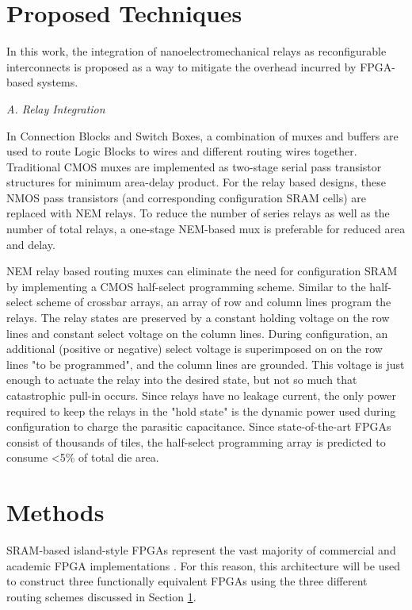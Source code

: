 \documentclass[twoside,twocolumn]{article}
\begin{document}

\section{Proposed Techniques}\label{sec:proposed}

In this work, the integration of nanoelectromechanical relays as reconfigurable interconnects is proposed as a way to mitigate the overhead incurred by FPGA-based systems. 

\textit{A. Relay Integration}

In Connection Blocks and Switch Boxes, a combination of muxes and buffers are used to route Logic Blocks to wires and different routing wires together. Traditional CMOS muxes are implemented as two-stage serial pass transistor structures for minimum area-delay product. For the relay based designs, these NMOS pass transistors (and corresponding configuration SRAM cells) are replaced with NEM relays. To reduce the number of series relays as well as the number of total relays, a one-stage NEM-based mux is preferable for reduced area and delay\cite{chen_efficient_2010}.

NEM relay based routing muxes can eliminate the need for configuration SRAM by implementing a CMOS half-select programming scheme\cite{chen_efficient_2010}. Similar to the half-select scheme of crossbar arrays, an array of row and column lines program the relays. The relay states are preserved by a constant holding voltage on the row lines and constant select voltage on the column lines. During configuration, an additional (positive or negative) select voltage is superimposed on on the row lines "to be programmed", and the column lines are grounded. This voltage is just enough to actuate the relay into the desired state, but not so much that catastrophic pull-in occurs. Since relays have no leakage current, the only power required to keep the relays in the "hold state" is the dynamic power used during configuration to charge the parasitic capacitance. Since state-of-the-art FPGAs consist of thousands of tiles, the half-select programming array is predicted to consume <5\% of total die area.


\section{Methods}\label{sec:methods}
SRAM-based island-style FPGAs represent the vast majority of commercial and academic
FPGA implementations \cite{farooq_fpga_2012}. For this reason, this architecture 
will be used to construct three functionally equivalent FPGAs using the three different
routing schemes discussed in Section \ref{sec:proposed}. 
\end{document}
